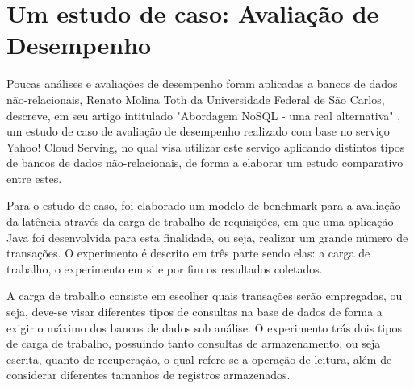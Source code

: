 \documentclass[12pt]{article}
\begin{document}


\section{Um estudo de caso: Avaliação de Desempenho}
\label{sec:estudoDeCaso}

Poucas análises e avaliações de desempenho foram aplicadas a bancos de dados não-relacionais, Renato Molina Toth da Universidade Federal de São Carlos, descreve, em seu artigo intitulado "Abordagem NoSQL - uma real alternativa" \cite{toth2011abordagem}, um estudo de caso de avaliação de desempenho realizado com base no serviço Yahoo! Cloud Serving, no qual visa utilizar este serviço aplicando distintos tipos de bancos de dados não-relacionais, de forma a elaborar um estudo comparativo entre estes.

Para o estudo de caso, foi elaborado um modelo de benchmark para a avaliação da latência através da carga de trabalho de requisições, em que uma aplicação Java foi desenvolvida para esta finalidade, ou seja, realizar um grande número de transações. O experimento é descrito em três parte sendo elas: a carga de trabalho, o experimento em si e por fim os resultados coletados.

A carga de trabalho consiste em escolher quais transações serão empregadas, ou seja, deve-se visar diferentes tipos de consultas na base de dados de forma a exigir o máximo dos bancos de dados sob análise. O experimento trás dois tipos de carga de trabalho, possuindo tanto consultas de armazenamento, ou seja escrita, quanto de recuperação, o qual refere-se a operação de leitura, além de considerar diferentes tamanhos de registros armazenados.
\end{document}
